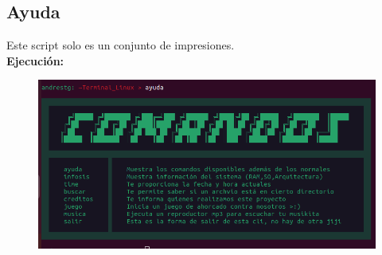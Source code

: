 \documentclass[letter,12pt]{article} %
\begin{document}
\subsection{Ayuda}
Este script solo es un conjunto de impresiones.\\
\textbf{Ejecución:}\par
\begin{figure}[H]
	\centering
	\includegraphics[scale=0.6]{imagenes/ayuda.png}
\end{figure}
\end{document}
